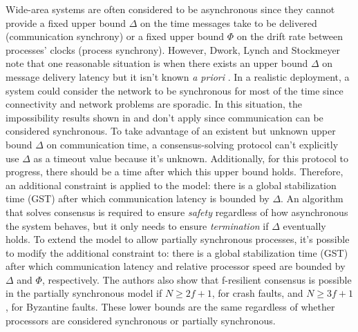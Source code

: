 \documentclass[runningheads,a4paper]{llncs}
\begin{document}
Wide-area systems are often considered to be asynchronous since they cannot provide a fixed upper bound $\Delta$ on the time messages take to be delivered (communication synchrony) or a fixed upper bound $\Phi$ on the drift rate between processes' clocks (process synchrony). However, Dwork, Lynch and Stockmeyer note that one reasonable situation is when there exists an upper bound $\Delta$ on message delivery latency but it isn't known \textit{a priori} \cite{Dwork1988}. In a realistic deployment, a system could consider the network to be synchronous for most of the time since connectivity and network problems are sporadic. In this situation, the impossibility results shown in \cite{Fischer1985} and \cite{Dolev1983} don't apply since communication can be considered synchronous. To take advantage of an existent but unknown upper bound $\Delta$ on communication time, a consensus-solving protocol can't explicitly use $\Delta$ as a timeout value because it's unknown. Additionally, for this protocol to progress, there should be a time after which this upper bound holds. Therefore, an additional constraint is applied to the model: there is a global stabilization time (GST) after which communication latency is bounded by $\Delta$. An algorithm that solves consensus is required to ensure \textit{safety} regardless of how asynchronous the system behaves, but it only needs to ensure \textit{termination} if $\Delta$ eventually holds. To extend the model to allow partially synchronous processes, it's possible to modify the additional constraint to: there is a global stabilization time (GST) after which communication latency and relative processor speed are bounded by $\Delta$ and $\Phi$, respectively. The authors also show that f-resilient consensus is possible in the partially synchronous model if $N \geq 2f+1$, for crash faults, and $N \geq 3f+1$, for Byzantine faults. These lower bounds are the same regardless of whether processors are considered synchronous or partially synchronous.\par
\end{document}
